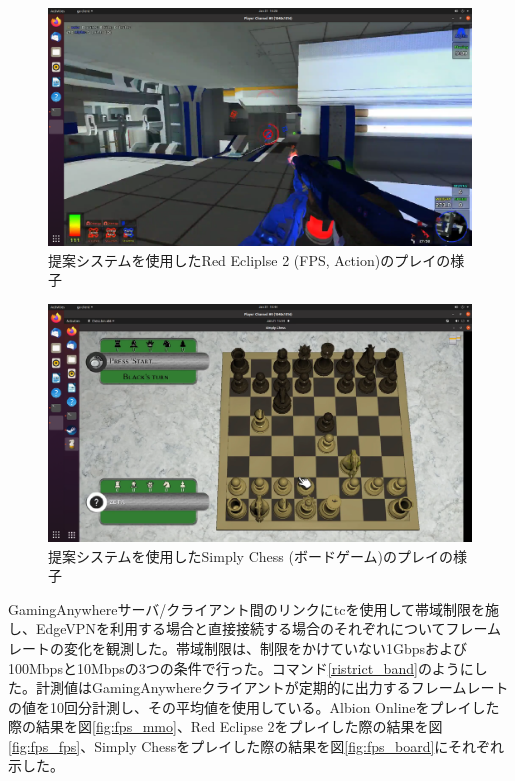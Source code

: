 \begin{figure}[h!]
    \centering
    \includegraphics[width=\textwidth,keepaspectratio,clip]{img/screen_fps.pdf}
    \caption{提案システムを使用したRed Ecliplse 2 (FPS, Action)のプレイの様子}
    \label{fig:screen_fps}
\end{figure}

\begin{figure}[h!]
    \centering
    \includegraphics[width=\textwidth,keepaspectratio,clip]{img/screen_board.pdf}
    \caption{提案システムを使用したSimply Chess (ボードゲーム)のプレイの様子}
    \label{fig:screen_board}
\end{figure}

GamingAnywhereサーバ/クライアント間のリンクにtcを使用して帯域制限を施し、EdgeVPNを利用する場合と直接接続する場合のそれぞれについてフレームレートの変化を観測した。帯域制限は、制限をかけていない1Gbpsおよび100Mbpsと10Mbpsの3つの条件で行った。コマンド\ref{ristrict_band}のようにした。計測値はGamingAnywhereクライアントが定期的に出力するフレームレートの値を10回分計測し、その平均値を使用している。Albion Onlineをプレイした際の結果を図\ref{fig:fps_mmo}、Red Eclipse 2をプレイした際の結果を図\ref{fig:fps_fps}、Simply Chessをプレイした際の結果を図\ref{fig:fps_board}にそれぞれ示した。


